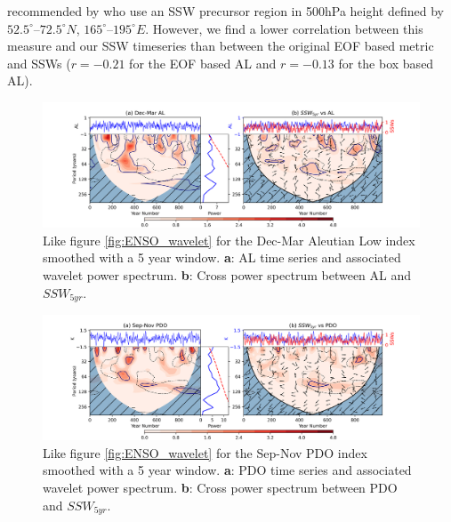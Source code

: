 recommended by \cite{garfinkelWhy2012b} who use an SSW precursor region in 500hPa height defined by $52.5^{\circ}$–$72.5^{\circ}N$, $165^{\circ}$–$195^{\circ}E$. However, we find a lower correlation between this measure and our SSW timeseries than between the original EOF based metric and SSWs ($r = -0.21$ for the EOF based AL and $r = -0.13$ for the box based AL).


\begin{figure}[h!]
\begin{center}
\includegraphics[width = \linewidth]{Figures/Figures-origins/AL_wavelet_combined.png}
\caption{Like figure \ref{fig:ENSO_wavelet} for the Dec-Mar Aleutian Low index smoothed with a 5 year window. \textbf{a}: AL time series and associated wavelet power spectrum. \textbf{b}: Cross power spectrum between AL and $SSW_{5yr}$.}
\label{fig:AL_wavelet}
\end{center}
\end{figure}

\begin{figure}[h!]
\begin{center}
\includegraphics[width = \linewidth]{Figures/Figures-origins/PDO_wavelet_combined.png}
\caption[Wavelet power spectrum for 5 year mean PDO index from UKESM]{Like figure \ref{fig:ENSO_wavelet} for the Sep-Nov PDO index smoothed with a 5 year window. \textbf{a}: PDO time series and associated wavelet power spectrum. \textbf{b}: Cross power spectrum between PDO and $SSW_{5yr}$.}
\label{fig:PDO_wavelet}
\end{center}
\end{figure}

